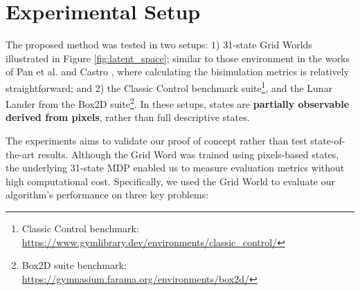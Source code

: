 \chapter{Experimental Setup}
\label{sec:experimental_setup}

The proposed method was tested in two setups: 1) 31-state Grid Worlds illustrated in Figure \ref{fig:latent_space}; similar to those environment in the works of Pan et al. \cite{pan2022understanding} and Castro \cite{castro2020scalable}, where calculating the bisimulation metrics is relatively straightforward; and 2) the Classic Control benchmark suite\footnote{Classic Control benchmark: \href{https://www.gymlibrary.dev/environments/classic_control/}{https://www.gymlibrary.dev/environments/classic\_control/}}, and the Lunar Lander from the Box2D suite\footnote{Box2D suite benchmark: \href{https://gymnasium.farama.org/environments/box2d/}{https://gymnasium.farama.org/environments/box2d/}}. In these setups, states are \textbf{partially observable derived from pixels}, rather than full descriptive states.

The experiments aims to validate our proof of concept rather than test state-of-the-art results. Although the Grid Word was trained using pixels-based states, the underlying 31-state MDP enabled us to measure evaluation metrics without high computational cost. Specifically, we used the Grid World to evaluate our algorithm's performance on three key problems:

